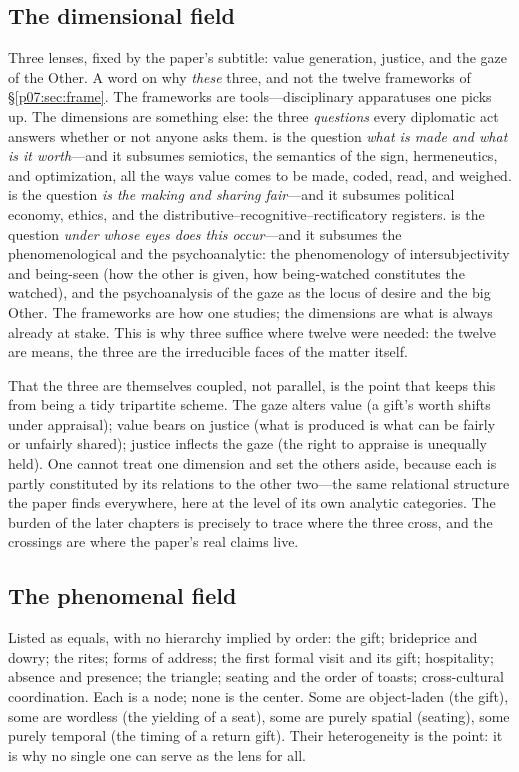 \documentclass[11pt,a4paper]{article}
\newcommand{\emb}[1]{\textcolor{rose}{\oldtextbf{#1}}}
\newcommand{\xref}[1]{\textcolor{rose}{\S\ref{#1}}}
\begin{document}
\subsection{The dimensional field}
Three lenses, fixed by the paper's subtitle: value generation, justice, and the gaze of the Other. A word on why \emph{these} three, and not the twelve frameworks of \xref{p07:sec:frame}. The frameworks are tools---disciplinary apparatuses one picks up. The dimensions are something else: the three \emph{questions} every diplomatic act answers whether or not anyone asks them. \emb{Value generation} is the question \emph{what is made and what is it worth}---and it subsumes semiotics, the semantics of the sign, hermeneutics, and optimization, all the ways value comes to be made, coded, read, and weighed. \emb{Justice} is the question \emph{is the making and sharing fair}---and it subsumes political economy, ethics, and the distributive--recognitive--rectificatory registers. \emb{The gaze of the Other} is the question \emph{under whose eyes does this occur}---and it subsumes the phenomenological and the psychoanalytic: the phenomenology of intersubjectivity and being-seen (how the other is given, how being-watched constitutes the watched), and the psychoanalysis of the gaze as the locus of desire and the big Other. The frameworks are how one studies; the dimensions are what is always already at stake. This is why three suffice where twelve were needed: the twelve are means, the three are the irreducible faces of the matter itself.

That the three are themselves coupled, not parallel, is the point that keeps this from being a tidy tripartite scheme. The gaze alters value (a gift's worth shifts under appraisal); value bears on justice (what is produced is what can be fairly or unfairly shared); justice inflects the gaze (the right to appraise is unequally held). One cannot treat one dimension and set the others aside, because each is partly constituted by its relations to the other two---the same relational structure the paper finds everywhere, here at the level of its own analytic categories. The burden of the later chapters is precisely to trace where the three cross, and the crossings are where the paper's real claims live.

\subsection{The phenomenal field}
Listed as equals, with no hierarchy implied by order: the gift; brideprice and dowry; the rites; forms of address; the first formal visit and its gift; hospitality; absence and presence; the triangle; seating and the order of toasts; cross-cultural coordination. Each is a node; none is the center. Some are object-laden (the gift), some are wordless (the yielding of a seat), some are purely spatial (seating), some purely temporal (the timing of a return gift). Their heterogeneity is the point: it is why no single one can serve as the lens for all.
\end{document}
